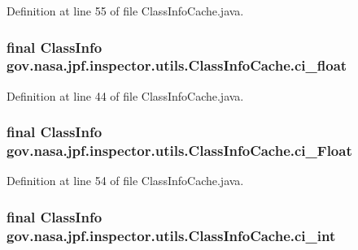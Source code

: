 Definition at line 55 of file Class\+Info\+Cache.\+java.

\subsubsection[{\texorpdfstring{ci\+\_\+float}{ci_float}}]{\setlength{\rightskip}{0pt plus 5cm}final Class\+Info gov.\+nasa.\+jpf.\+inspector.\+utils.\+Class\+Info\+Cache.\+ci\+\_\+float}\hypertarget{classgov_1_1nasa_1_1jpf_1_1inspector_1_1utils_1_1_class_info_cache_a047975f4a6c537957243b2e5a009f4aa}{}\label{classgov_1_1nasa_1_1jpf_1_1inspector_1_1utils_1_1_class_info_cache_a047975f4a6c537957243b2e5a009f4aa}


Definition at line 44 of file Class\+Info\+Cache.\+java.

\subsubsection[{\texorpdfstring{ci\+\_\+\+Float}{ci_Float}}]{\setlength{\rightskip}{0pt plus 5cm}final Class\+Info gov.\+nasa.\+jpf.\+inspector.\+utils.\+Class\+Info\+Cache.\+ci\+\_\+\+Float}\hypertarget{classgov_1_1nasa_1_1jpf_1_1inspector_1_1utils_1_1_class_info_cache_a9ebf72e1a4190d413f91925f5a0d56a0}{}\label{classgov_1_1nasa_1_1jpf_1_1inspector_1_1utils_1_1_class_info_cache_a9ebf72e1a4190d413f91925f5a0d56a0}


Definition at line 54 of file Class\+Info\+Cache.\+java.

\subsubsection[{\texorpdfstring{ci\+\_\+int}{ci_int}}]{\setlength{\rightskip}{0pt plus 5cm}final Class\+Info gov.\+nasa.\+jpf.\+inspector.\+utils.\+Class\+Info\+Cache.\+ci\+\_\+int}\hypertarget{classgov_1_1nasa_1_1jpf_1_1inspector_1_1utils_1_1_class_info_cache_ae1f0dede5e0ce0e7e65305520ccc4814}{}\label{classgov_1_1nasa_1_1jpf_1_1inspector_1_1utils_1_1_class_info_cache_ae1f0dede5e0ce0e7e65305520ccc4814}


